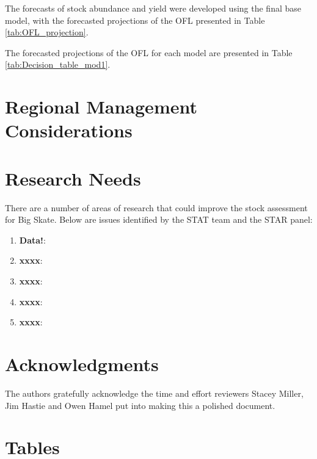 \documentclass[12pt,]{article}
\begin{document}
The forecasts of stock abundance and yield were developed using the
final base model, with the forecasted projections of the OFL presented
in Table \ref{tab:OFL_projection}.

The forecasted projections of the OFL for each model are presented in
Table \ref{tab:Decision_table_mod1}.

\newpage

\hypertarget{regional-management-considerations}{%
\section{Regional Management
Considerations}\label{regional-management-considerations}}

\newpage

\hypertarget{research-needs}{%
\section{Research Needs}\label{research-needs}}

There are a number of areas of research that could improve the stock
assessment for Big Skate. Below are issues identified by the STAT team
and the STAR panel:

\begin{enumerate}

\item \textbf{Data!}: 

\item \textbf{xxxx}:

\item \textbf{xxxx}:

\item \textbf{xxxx}:

\item \textbf{xxxx}:

\end{enumerate}

\hypertarget{acknowledgments}{%
\section{Acknowledgments}\label{acknowledgments}}

The authors gratefully acknowledge the time and effort reviewers Stacey
Miller, Jim Hastie and Owen Hamel put into making this a polished
document.

\newpage
\FloatBarrier
\newpage

\hypertarget{tables}{%
\section{Tables}\label{tables}}
\end{document}
